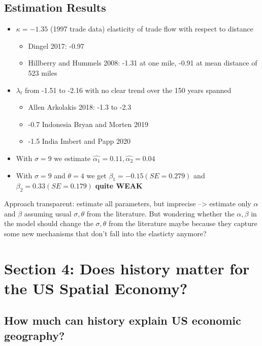 \documentclass[12pt, final]{article}
\begin{document}
\subsection{Estimation Results} %
\label{sub:estimation_results}
\begin{itemize}
    \item $\kappa = -1.35$ (1997 trade data) elasticity of trade flow with respect to distance
    \begin{itemize}
         \item Dingel 2017: -0.97
         \item Hillberry and Hummels 2008: -1.31 at one mile, -0.91 at mean distance of 523 miles
     \end{itemize}
     \item $\lambda_t$ from -1.51 to -2.16 with no clear trend over the 150 years spanned
     \begin{itemize}
          \item Allen Arkolakis 2018: -1.3 to -2.3
          \item -0.7 Indonesia Bryan and Morten 2019
          \item -1.5 India Imbert and Papp 2020
      \end{itemize} 
      \item With $\sigma=9$ we estimate $\hat{\alpha_1} = 0.11, \hat{\alpha_2} = 0.04$
      \item With $\sigma=9$ and $\theta=4$ we get $\beta_1 = -0.15 (SE=0.279)$ and $\beta_2  = 0.33 (SE=0.179)$ \textbf{quite WEAK}
\end{itemize}
Approach transparent: estimate all parameters, but imprecise --> estimate only $\alpha$ and $\beta$ assuming usual $\sigma, \theta$ from the literature. But wondering whether the $\alpha, \beta$ in the model should change the $\sigma, \theta$ from the literature maybe because they capture some new mechanisms that don't fall into the elasticty anymore?
\\


  


\section*{Section 4: Does history matter for the US Spatial Economy?} %
\label{sec:section_4_does_history_matter_for_the_us_spatial_economy_}


\subsection*{How much can history explain US economic geography?} %
\label{sub:how_much_can_history_explain_us_economic_geography_}
\end{document}

